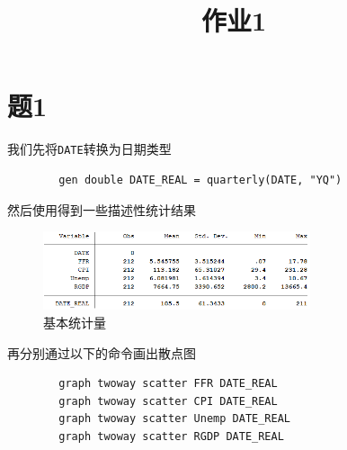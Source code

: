 \documentclass[cn]{homework}
\title{作业1}
\begin{document}
    \maketitle

    \section{题1}

    我们先将\colorbox{lbcolor}{\lstinline{DATE}}转换为日期类型
    \begin{lstlisting}
        gen double DATE_REAL = quarterly(DATE, "YQ")
    \end{lstlisting}
    然后使用得到一些描述性统计结果
    \begin{figure}[h]
        \centering
        \includegraphics[width=0.7\textwidth]{summarize.png} 
        \caption{基本统计量}
    \end{figure}

    再分别通过以下的命令画出散点图
    \begin{lstlisting}
        graph twoway scatter FFR DATE_REAL
        graph twoway scatter CPI DATE_REAL
        graph twoway scatter Unemp DATE_REAL
        graph twoway scatter RGDP DATE_REAL
    \end{lstlisting}
\end{document}
